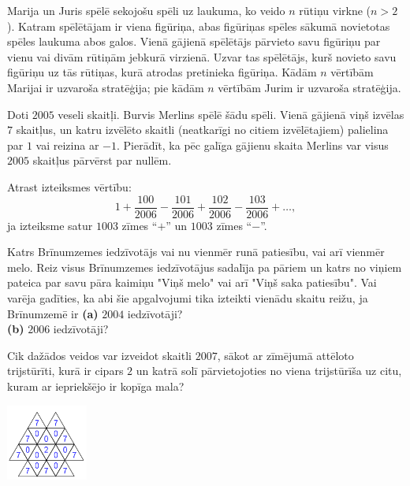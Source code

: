 \documentclass[11pt]{article}
\begin{document}
\begin{problem}[EE.PK.2004.9.4]
Marija un Juris spēlē sekojošu spēli uz laukuma, 
ko veido $n$ rūtiņu virkne ($n > 2$). 
Katram spēlētājam ir viena figūriņa, abas figūriņas 
spēles sākumā novietotas spēles laukuma abos galos. 
Vienā gājienā spēlētājs pārvieto savu figūriņu par vienu vai 
divām rūtiņām jebkurā virzienā. 
Uzvar tas spēlētājs, kurš novieto savu figūriņu uz tās
rūtiņas, kurā atrodas pretinieka figūriņa. 
Kādām $n$ vērtībām Marijai ir uzvaroša stratēģija; 
pie kādām $n$ vērtībām Jurim ir uzvaroša stratēģija.
\end{problem}

\begin{problem}[EE.PK.2005.9.4]
Doti $2005$ veseli skaitļi. Burvis Merlins spēlē šādu spēli. 
Vienā gājienā viņš izvēlas $7$ skaitļus, un katru izvēlēto 
skaitli (neatkarīgi no citiem izvēlētajiem) palielina par $1$
vai reizina ar $-1$. Pierādīt, ka pēc galīga gājienu skaita 
Merlins var visus $2005$ skaitļus pārvērst par nullēm. 
\end{problem}

\begin{problem}[EE.PK.2006.9.TEST.4]
Atrast izteiksmes vērtību:
$$1 + \frac{100}{2006} - \frac{101}{2006} + \frac{102}{2006} - \frac{103}{2006} + \ldots,$$
ja izteiksme satur $1003$ zīmes ``$+$'' un $1003$ zīmes ``$-$''.
\end{problem}

\begin{problem}[EE.PK.2006.9.4]
Katrs Brīnumzemes iedzīvotājs vai nu vienmēr runā patiesību, vai 
arī vienmēr melo. Reiz visus Brīnumzemes iedzīvotājus sadalīja
pa pāriem un katrs no viņiem pateica par savu pāra kaimiņu 
"Viņš melo" vai arī "Viņš saka patiesību". Vai varēja gadīties, 
ka abi šie apgalvojumi tika izteikti vienādu skaitu reižu, ja 
Brīnumzemē ir {\bf (a)} $2004$ iedzīvotāji?\\
{\bf (b)} $2006$ iedzīvotāji?
\end{problem}


\begin{problem}[EE.PK.2007.7.TEST.6]
Cik dažādos veidos var izveidot skaitli $2007$, sākot ar 
zīmējumā attēloto trijstūrīti, kurā ir cipars $2$ un 
katrā solī pārvietojoties no viena trijstūrīša uz citu, 
kuram ar iepriekšējo ir kopīga mala?
\begin{center}
\includegraphics[width=0.2\textwidth]{math-induction-junior-classes/EE-PK-2007-7-TEST-6.png}
\end{center}
\end{problem}
\end{document}
